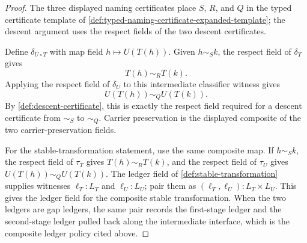 \begin{proof}
The three displayed naming certificates place $S$, $R$, and $Q$ in the typed certificate template of \autoref{def:typed-naming-certificate-expanded-template}; the descent argument uses the respect fields of the two descent certificates.

Define $\delta_{U\circ T}$ with map field $h\mapsto U(T(h))$. Given $h\sim_S k$, the respect field of $\delta_T$ gives
$$
T(h)\sim_R T(k).
$$
Applying the respect field of $\delta_U$ to this intermediate classifier witness gives
$$
U(T(h))\sim_Q U(T(k)).
$$
By \autoref{def:descent-certificate}, this is exactly the respect field required for a descent certificate from $\sim_S$ to $\sim_Q$. Carrier preservation is the displayed composite of the two carrier-preservation fields.

For the stable-transformation statement, use the same composite map. If $h\sim_S k$, the respect field of $\tau_T$ gives $T(h)\sim_R T(k)$, and the respect field of $\tau_U$ gives $U(T(h))\sim_Q U(T(k))$. The ledger field of \autoref{def:stable-transformation} supplies witnesses $\ell_T:L_T$ and $\ell_U:L_U$; pair them as $(\ell_T,\ell_U):L_T\times L_U$. This gives the ledger field for the composite stable transformation. When the two ledgers are gap ledgers, the same pair records the first-stage ledger and the second-stage ledger pulled back along the intermediate interface, which is the composite ledger policy cited above.
\end{proof}

